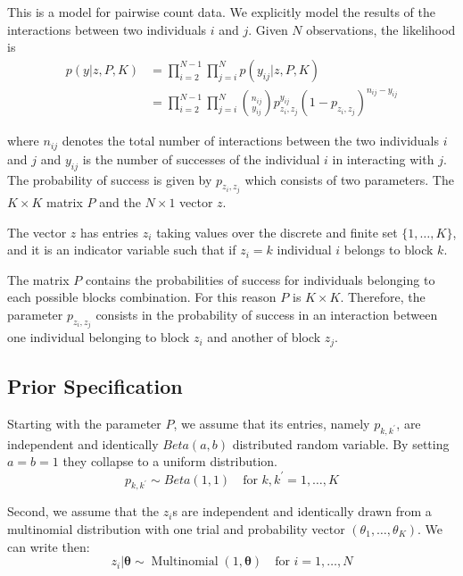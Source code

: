 \documentclass[11pt]{amsart}
\begin{document}
This is a model for pairwise count data. We explicitly model the results of the interactions between two individuals $i$ and $j$. Given $N$ observations, the likelihood is 
\begin{align}
p(y| z, P, K) &= \prod_{i =2 }^{N-1} \prod_{j =i}^{N} p(y_{ij} | z, P, K) \\ 
&= \prod_{i =2 }^{N-1} \prod_{j =i}^{N}  {n_{ij} \choose y_{ij}} p_{z_i, z_j}^{y_{ij}}(1- p_{z_i, z_j})^{n_{ij}-y_{ij}}
\end{align}

where $n_{ij}$ denotes the total number of interactions between the two individuals $i$ and $j$ and $y_{ij}$ is the number of successes of the individual $i$ in interacting with $j$. The probability of success is given by $p_{z_i, z_j}$ which consists of two parameters. The $K\times K$ matrix $P$ and the $N \times 1$ vector $z$.

The vector $z$ has entries $z_i$ taking values over the discrete and finite set $\{ 1 , \ldots, K\}$, and it is an indicator variable such that if $z_i = k$ individual $i$ belongs to block $k$. 

The matrix $P$ contains the probabilities of success for individuals belonging to each possible blocks combination. For this reason $P$ is $K\times K$. Therefore, the parameter $p_{z_i, z_j}$ consists in the probability of success in an interaction between one individual belonging to block $z_i$ and another of block $z_j$. 

\subsection{Prior Specification}


Starting with the parameter $P$, we assume that its entries, namely $p_{k,k^\prime}$, are independent and identically $Beta(a,b)$ distributed random variable. By setting $a=b=1$ they collapse to a uniform distribution.
\begin{equation}
p_{k,k^\prime} \sim Beta(1,1) \quad \text{for } k,k^\prime = 1, \ldots,K
\end{equation}

Second, we assume that the $z_i$s are independent and identically drawn from a multinomial distribution with one trial and probability vector $(\theta_1, \dots, \theta_K)$. We can write then:
\begin{equation}
z_i| \boldsymbol{\theta} \sim \operatorname{Multinomial}(1,\boldsymbol{\theta}) \quad \text{for } i = 1, \ldots,N
\end{equation}
\end{document}
